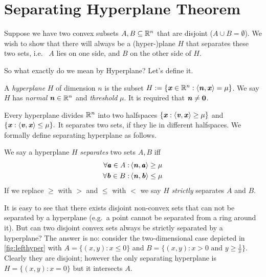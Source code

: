 \section{Separating Hyperplane Theorem}
Suppose we have two convex subsets $A, B \subseteq \mathbb{R}^n$ that are disjoint ($A \cup B = \emptyset$).
We wish to show that there will always be a (hyper-)plane $H$ that separates these two sets, i.e.~ $A$ lies on one side, and $B$ on the other side of $H$.

So what exactly do we mean by Hyperplane? Let's define it.
\begin{definition}[Hyperplane]
A \emph{hyperplane} $H$ of dimension $n$ is the subset $H := \{\boldsymbol{\mathit{x}} \in \mathbb{R}^n : \left< \boldsymbol{\mathit{n}}, \boldsymbol{\mathit{x}} \right> = \mu\}$.
We say $H$ has \emph{normal} $\boldsymbol{\mathit{n}} \in \mathbb{R}^n$ and \emph{threshold} $\mu$.
It is required that $\boldsymbol{\mathit{n}} \neq \boldsymbol{0}$.
\end{definition}

Every hyperplane divides $\mathbb{R}^n$ into two halfspaces $\{\boldsymbol{\mathit{x}} : \left< \boldsymbol{\mathit{v}}, \boldsymbol{\mathit{x}} \right> \geq \mu\}$ and $\{\boldsymbol{\mathit{x}} : \left< \boldsymbol{\mathit{v}}, \boldsymbol{\mathit{x}} \right> \leq \mu\}.$
It separates two sets, if they lie in different halfspaces. We formally define separating hyperplane as follows.

\begin{definition}
We say a hyperplane $H$ \emph{separates} two sets $A, B$ iff
\begin{align*}
  \forall \pmb{\mathit{a}} \in A:& \left< \boldsymbol{\mathit{n}}, \pmb{\mathit{a}} \right> \geq \mu \\
  \forall \boldsymbol{\mathit{b}} \in B:& \left< \boldsymbol{\mathit{n}}, \boldsymbol{\mathit{b}} \right> \leq \mu
\end{align*}
If we replace $\geq$ with $>$ and $\leq$ with $<$ we say $H$ \emph{strictly} separates $A$ and $B$.
\end{definition}

It is easy to see that there exists disjoint non-convex sets that can not be
separated by a hyperplane (e.g.\ a point cannot be separated from a
ring around it). But can two disjoint convex sets always be strictly separated by a hyperplane?
The answer is no: consider the two-dimensional case depicted in
\autoref{fig:lefthyper} with $A = \{ (x,y): x \leq 0\}$ and $B = \{
(x, y) : x> 0 \text{ and } y \geq \frac{1}{x}\}$. Clearly they are disjoint; however the only separating hyperplane is $H = \{ (x, y): x = 0\}$ but it intersects $A$.

